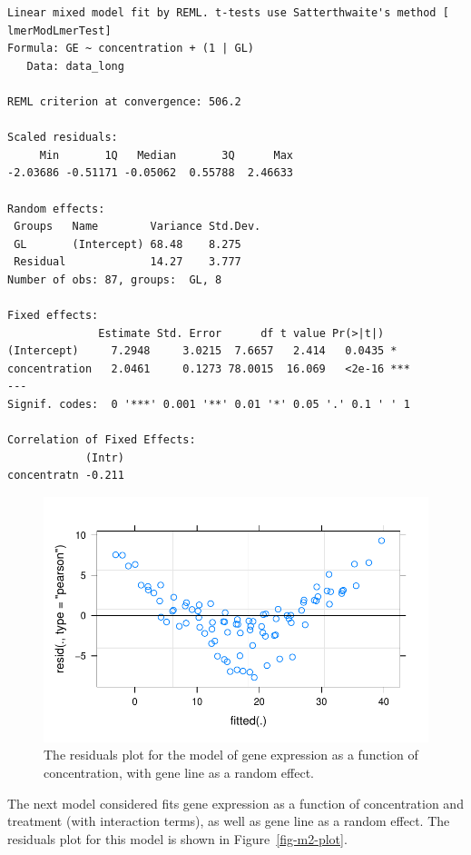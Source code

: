 \documentclass[
  letterpaper,
  DIV=11,
  numbers=noendperiod]{scrartcl}
\begin{document}
\begin{verbatim}
Linear mixed model fit by REML. t-tests use Satterthwaite's method [
lmerModLmerTest]
Formula: GE ~ concentration + (1 | GL)
   Data: data_long

REML criterion at convergence: 506.2

Scaled residuals: 
     Min       1Q   Median       3Q      Max 
-2.03686 -0.51171 -0.05062  0.55788  2.46633 

Random effects:
 Groups   Name        Variance Std.Dev.
 GL       (Intercept) 68.48    8.275   
 Residual             14.27    3.777   
Number of obs: 87, groups:  GL, 8

Fixed effects:
              Estimate Std. Error      df t value Pr(>|t|)    
(Intercept)     7.2948     3.0215  7.6657   2.414   0.0435 *  
concentration   2.0461     0.1273 78.0015  16.069   <2e-16 ***
---
Signif. codes:  0 '***' 0.001 '**' 0.01 '*' 0.05 '.' 0.1 ' ' 1

Correlation of Fixed Effects:
            (Intr)
concentratn -0.211
\end{verbatim}

\begin{figure}

{\centering \includegraphics{2023-05-16_IMRaD-report_AStephenson_files/figure-pdf/fig-m1-plot-1.pdf}

}

\caption{\label{fig-m1-plot}The residuals plot for the model of gene
expression as a function of concentration, with gene line as a random
effect.}

\end{figure}

The next model considered fits gene expression as a function of
concentration and treatment (with interaction terms), as well as gene
line as a random effect. The residuals plot for this model is shown in
Figure~\ref{fig-m2-plot}.
\end{document}
